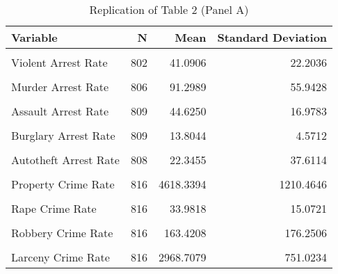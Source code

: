 \begin{table}[H]

\caption{\label{tab:tab:replicatetable2a}Replication of Table 2 (Panel A)}
\centering
\begin{tabular}[t]{lrrr}
\toprule
Variable & N & Mean & Standard Deviation\\
\midrule
\cellcolor{gray!6}{Shalll} & \cellcolor{gray!6}{816} & \cellcolor{gray!6}{0.1912} & \cellcolor{gray!6}{0.3935}\\
Violent Arrest Rate & 802 & 41.0906 & 22.2036\\
\cellcolor{gray!6}{Property Arrest Rate} & \cellcolor{gray!6}{809} & \cellcolor{gray!6}{16.9180} & \cellcolor{gray!6}{4.6770}\\
Murder Arrest Rate & 806 & 91.2989 & 55.9428\\
\cellcolor{gray!6}{Rape Arrest Rate} & \cellcolor{gray!6}{799} & \cellcolor{gray!6}{41.0231} & \cellcolor{gray!6}{17.3887}\\
\addlinespace
Assault Arrest Rate & 809 & 44.6250 & 16.9783\\
\cellcolor{gray!6}{Robery Arrest Rate} & \cellcolor{gray!6}{808} & \cellcolor{gray!6}{31.4581} & \cellcolor{gray!6}{13.5928}\\
Burglary Arrest Rate & 809 & 13.8044 & 4.5712\\
\cellcolor{gray!6}{Larceny Arrest Rate} & \cellcolor{gray!6}{809} & \cellcolor{gray!6}{18.5372} & \cellcolor{gray!6}{5.1961}\\
Autotheft Arrest Rate & 808 & 22.3455 & 37.6114\\
\addlinespace
\cellcolor{gray!6}{Violent Crime Rate} & \cellcolor{gray!6}{816} & \cellcolor{gray!6}{483.9260} & \cellcolor{gray!6}{318.9425}\\
Property Crime Rate & 816 & 4618.3394 & 1210.4646\\
\cellcolor{gray!6}{Murder Crime Rate} & \cellcolor{gray!6}{816} & \cellcolor{gray!6}{7.7683} & \cellcolor{gray!6}{6.8817}\\
Rape Crime Rate & 816 & 33.9818 & 15.0721\\
\cellcolor{gray!6}{Assault Crime Rate} & \cellcolor{gray!6}{816} & \cellcolor{gray!6}{278.7551} & \cellcolor{gray!6}{159.6495}\\
\addlinespace
Robbery Crime Rate & 816 & 163.4208 & 176.2506\\
\cellcolor{gray!6}{Burglary Crime Rate} & \cellcolor{gray!6}{816} & \cellcolor{gray!6}{1239.3364} & \cellcolor{gray!6}{417.7576}\\
Larceny Crime Rate & 816 & 2968.7079 & 751.0234\\

\end{tabular}
\end{table}
